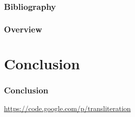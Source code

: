 \documentclass{beamer}
\begin{document}
\begin{frame}
    \frametitle{Bibliography}
    {\fontsize{0.8em}{1em}
    \nocite{*}
    
    }
\end{frame}

\begin{frame}
    \frametitle{Overview}
\end{frame}

\section{Conclusion}
\begin{frame}
    \frametitle{Conclusion}
    \url{https://code.google.com/p/transliteration}
\end{frame}
\end{document}
